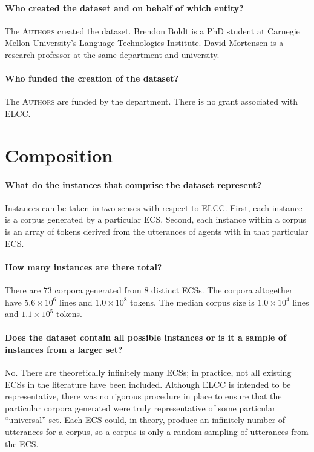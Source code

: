 \documentclass{article}
\newcommand\A{\textsc{Authors}}
\begin{document}
\paragraph{Who created the dataset and on behalf of which entity?}
The \A{} created the dataset.
Brendon Boldt is a PhD student at Carnegie Mellon University's Language Technologies Institute.
David Mortensen is a research professor at the same department and university.

\paragraph{Who funded the creation of the dataset?}
The \A{} are funded by the department.
There is no grant associated with ELCC\@.


\section{Composition}
\paragraph{What do the instances that comprise the dataset represent?}
Instances can be taken in two senses with respect to ELCC\@.
First, each instance is a corpus generated by a particular ECS\@.
Second, each instance within a corpus is an array of tokens derived from the utterances of agents with in that particular ECS\@.

\newcommand\ee[1]{\times10^{#1}}

\paragraph{How many instances are there total?}
There are $73$ corpora generated from $8$ distinct ECSs.
The corpora altogether have $5.6\ee6$ lines and $1.0\ee8$ tokens.
The median corpus size is $1.0\ee4$ lines and $1.1\ee5$ tokens.


\paragraph{Does the dataset contain all possible instances or is it a sample of instances from a larger set?}
No.
There are theoretically infinitely many ECSs; in practice, not all existing ECSs in the literature have been included.
Although ELCC is intended to be representative, there was no rigorous procedure in place to ensure that the particular corpora generated were truly representative of some particular ``universal'' set.
Each ECS could, in theory, produce an infinitely number of utterances for a corpus, so a corpus is only a random sampling of utterances from the ECS\@.
\end{document}
